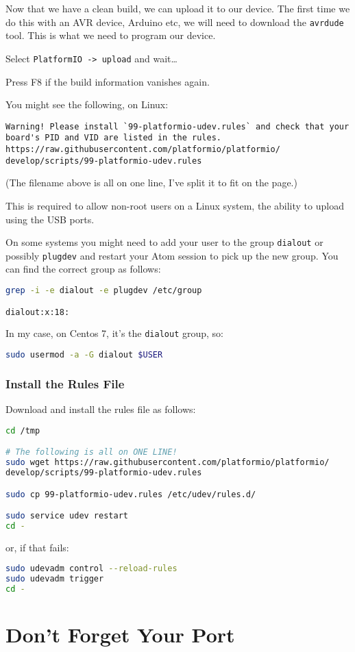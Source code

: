 Now that we have a clean build, we can upload it to our device. The
first time we do this with an AVR device, Arduino etc, we will need to
download the \lstinline!avrdude! tool. This is what we need to program
our device.

Select \lstinline!PlatformIO -> upload! and wait\ldots{}

Press F8 if the build information vanishes again.

You might see the following, on Linux:

\begin{lstlisting}
Warning! Please install `99-platformio-udev.rules` and check that your 
board's PID and VID are listed in the rules.
https://raw.githubusercontent.com/platformio/platformio/
develop/scripts/99-platformio-udev.rules
\end{lstlisting}

(The filename above is all on one line, I've split it to fit on the page.)

This is required to allow non-root users on a Linux system, the ability
to upload using the USB ports. 

On some systems you might need to add your 
user to the group \lstinline!dialout! or possibly \lstinline!plugdev! and 
restart your Atom session to pick up the new group. You can find the correct group
as follows:

\begin{lstlisting}[language=bash]
grep -i -e dialout -e plugdev /etc/group

dialout:x:18:
\end{lstlisting}

In my case, on Centos 7, it's the \lstinline!dialout! group, so:

\begin{lstlisting}[language=bash]
sudo usermod -a -G dialout $USER
\end{lstlisting}


\subsubsection{Install the Rules File}\label{install-the-rules-file}

Download and install the rules file as follows:

\begin{lstlisting}[language=bash]
cd /tmp

# The following is all on ONE LINE!
sudo wget https://raw.githubusercontent.com/platformio/platformio/
develop/scripts/99-platformio-udev.rules

sudo cp 99-platformio-udev.rules /etc/udev/rules.d/

sudo service udev restart
cd -
\end{lstlisting}

or, if that fails:

\begin{lstlisting}[language=bash]
sudo udevadm control --reload-rules
sudo udevadm trigger
cd -
\end{lstlisting}

\section{Don't Forget Your Port}
